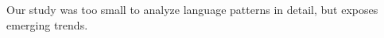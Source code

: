 %	





Our study was too small to analyze language patterns in detail, but exposes emerging trends.


